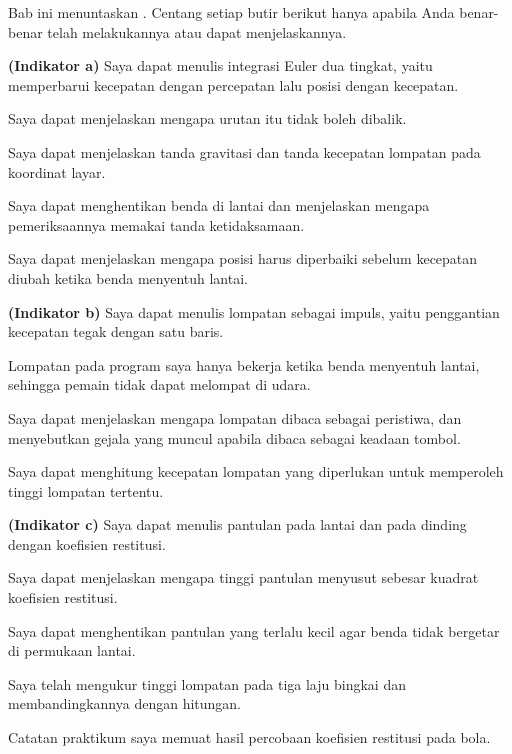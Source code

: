 
Bab ini menuntaskan . Centang setiap butir berikut hanya apabila
Anda benar-benar telah melakukannya atau dapat menjelaskannya.

\begin{checklistbox}
\begin{checklist}
  \item {\bfseries (Indikator a)} Saya dapat menulis integrasi Euler dua tingkat,
        yaitu memperbarui kecepatan dengan percepatan lalu posisi dengan
        kecepatan.
  \item Saya dapat menjelaskan mengapa urutan itu tidak boleh dibalik.
  \item Saya dapat menjelaskan tanda gravitasi dan tanda kecepatan lompatan
        pada koordinat layar.
  \item Saya dapat menghentikan benda di lantai dan menjelaskan mengapa
        pemeriksaannya memakai tanda ketidaksamaan.
  \item Saya dapat menjelaskan mengapa posisi harus diperbaiki sebelum
        kecepatan diubah ketika benda menyentuh lantai.
  \item {\bfseries (Indikator b)} Saya dapat menulis lompatan sebagai impuls,
        yaitu penggantian kecepatan tegak dengan satu baris.
  \item Lompatan pada program saya hanya bekerja ketika benda menyentuh lantai,
        sehingga pemain tidak dapat melompat di udara.
  \item Saya dapat menjelaskan mengapa lompatan dibaca sebagai peristiwa, dan
        menyebutkan gejala yang muncul apabila dibaca sebagai keadaan tombol.
  \item Saya dapat menghitung kecepatan lompatan yang diperlukan untuk
        memperoleh tinggi lompatan tertentu.
  \item {\bfseries (Indikator c)} Saya dapat menulis pantulan pada lantai dan
        pada dinding dengan koefisien restitusi.
  \item Saya dapat menjelaskan mengapa tinggi pantulan menyusut sebesar kuadrat
        koefisien restitusi.
  \item Saya dapat menghentikan pantulan yang terlalu kecil agar benda tidak
        bergetar di permukaan lantai.
  \item Saya telah mengukur tinggi lompatan pada tiga laju bingkai dan
        membandingkannya dengan hitungan.
  \item Catatan praktikum saya memuat hasil percobaan koefisien restitusi pada
        bola.
\end{checklist}
\end{checklistbox}
